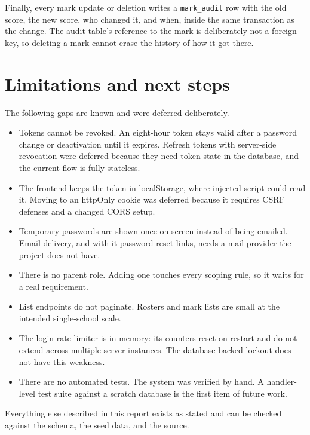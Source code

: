 \documentclass[11pt,a4paper]{article}
\begin{document}
Finally, every mark update or deletion writes a \texttt{mark\_audit} row with the old score, the new score, who changed it, and when, inside the same transaction as the change. The audit table's reference to the mark is deliberately not a foreign key, so deleting a mark cannot erase the history of how it got there.

\section{Limitations and next steps}

The following gaps are known and were deferred deliberately.

\begin{itemize}[itemsep=2pt]
\item Tokens cannot be revoked. An eight-hour token stays valid after a password change or deactivation until it expires. Refresh tokens with server-side revocation were deferred because they need token state in the database, and the current flow is fully stateless.
\item The frontend keeps the token in localStorage, where injected script could read it. Moving to an httpOnly cookie was deferred because it requires CSRF defenses and a changed CORS setup.
\item Temporary passwords are shown once on screen instead of being emailed. Email delivery, and with it password-reset links, needs a mail provider the project does not have.
\item There is no parent role. Adding one touches every scoping rule, so it waits for a real requirement.
\item List endpoints do not paginate. Rosters and mark lists are small at the intended single-school scale.
\item The login rate limiter is in-memory: its counters reset on restart and do not extend across multiple server instances. The database-backed lockout does not have this weakness.
\item There are no automated tests. The system was verified by hand. A handler-level test suite against a scratch database is the first item of future work.
\end{itemize}

Everything else described in this report exists as stated and can be checked against the schema, the seed data, and the source.
\end{document}

